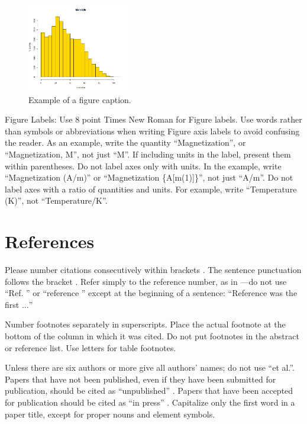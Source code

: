 \documentclass[conference, 10pt]{IEEEtran}
\begin{document}
\begin{figure}[htbp]
\centerline{\includegraphics[width=0.4\textwidth]{../Vistas/Graficca_3.png}}
\caption{Example of a figure caption.}
\label{fig2}
\end{figure}

Figure Labels: Use 8 point Times New Roman for Figure labels. Use words 
rather than symbols or abbreviations when writing Figure axis labels to 
avoid confusing the reader. As an example, write the quantity 
``Magnetization'', or ``Magnetization, M'', not just ``M''. If including 
units in the label, present them within parentheses. Do not label axes only 
with units. In the example, write ``Magnetization (A/m)'' or ``Magnetization 
\{A[m(1)]\}'', not just ``A/m''. Do not label axes with a ratio of 
quantities and units. For example, write ``Temperature (K)'', not 
``Temperature/K''.



\section*{References}

Please number citations consecutively within brackets \cite{b1}. The 
sentence punctuation follows the bracket \cite{b2}. Refer simply to the reference 
number, as in \cite{b3}---do not use ``Ref. \cite{b3}'' or ``reference \cite{b3}'' except at 
the beginning of a sentence: ``Reference \cite{b3} was the first $\ldots$''

Number footnotes separately in superscripts. Place the actual footnote at 
the bottom of the column in which it was cited. Do not put footnotes in the 
abstract or reference list. Use letters for table footnotes.

Unless there are six authors or more give all authors' names; do not use 
``et al.''. Papers that have not been published, even if they have been 
submitted for publication, should be cited as ``unpublished'' \cite{b4}. Papers 
that have been accepted for publication should be cited as ``in press'' \cite{b5}. 
Capitalize only the first word in a paper title, except for proper nouns and 
element symbols.
\end{document}
